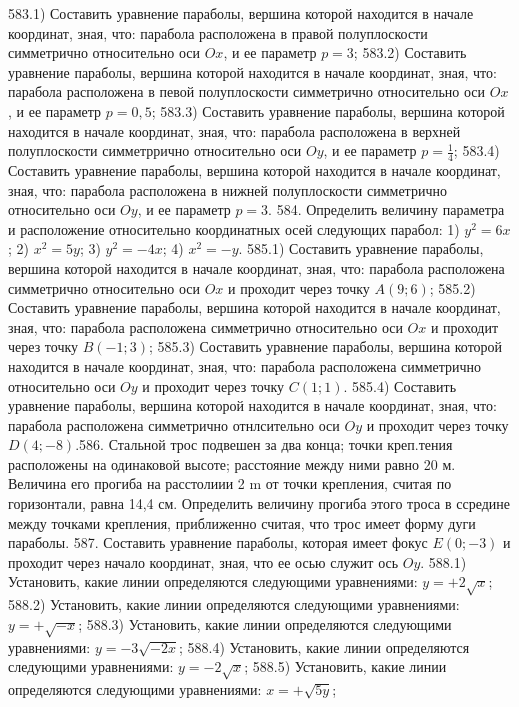 583.1) Составить уравнение параболы, вершина которой находится в начале координат, зная, что: парабола расположена в правой полуплоскости симметрично относительно оси $O x$, и ее параметр $p=3$;
583.2) Составить уравнение параболы, вершина которой находится в начале координат, зная, что: парабола расположена в певой полуплоскости симметрично относительно оси $O x$, и ее параметр $p=0,5$;
583.3) Составить уравнение параболы, вершина которой находится в начале координат, зная, что: парабола расположена в верхней полуплоскости симметррично относительно оси $O y$, и ее параметр $p=\frac{1}{4}$;
583.4) Составить уравнение параболы, вершина которой находится в начале координат, зная, что: парабола расположена в нижней полуплоскости симметрично относительно оси $O y$, и ее параметр $p=3$.
584. Определить величину параметра и расположение относительно координатных осей следующих парабол: 1) $y^2=6 x$; 2) $x^2=5 y$; 3) $y^2=-4 x$; 4) $x^2=-y$.
585.1) Составить уравнение параболы, вершина которой находится в начале координат, зная, что: парабола расположена симметрично относительно оси $O x$ и проходит через точку $A(9 ; 6)$;
585.2) Составить уравнение параболы, вершина которой находится в начале координат, зная, что: парабола расположена симметрично относительно оси $O x$ и проходит через точку $B(-1 ; 3)$;
585.3) Составить уравнение параболы, вершина которой находится в начале координат, зная, что: парабола расположена симметрично относительно оси $O y$ и проходит через точку $C(1 ; 1)$.
585.4) Составить уравнение параболы, вершина которой находится в начале координат, зная, что: парабола расположена симметрично отнлсительно оси $O y$ и проходит через точку $D(4 ;-8)$.586. Стальной трос подвешен за два конца; точки креп.тения расположены на одинаковой высоте; расстояние между ними равно 20 м. Величина его прогиба на расстолиии 2 m от точки крепления, считая по горизонтали, равна 14,4 см. Определить величину прогиба этого троса в ссредине между точками крепления, приближенно считая, что трос имеет форму дуги параболы.
587. Составить уравнение параболы, которая имеет фокус $E(0 ;-3)$ и проходит через начало координат, зная, что ее осью служит ось $O y$.
588.1) Установить, какие линии определяются следующими уравнениями: $y=+2 \sqrt{x}$;
588.2) Установить, какие линии определяются следующими уравнениями: $y=+\sqrt{-x}$;
588.3) Установить, какие линии определяются следующими уравнениями: $y=-3 \sqrt{-2 x}$;
588.4) Установить, какие линии определяются следующими уравнениями: $y=-2 \sqrt{x}$;
588.5) Установить, какие линии определяются следующими уравнениями: $x=+\sqrt{5 y}$;

